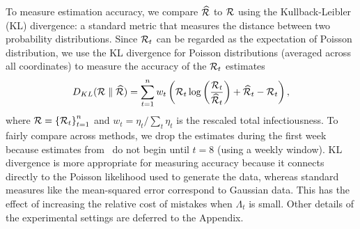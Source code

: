 To measure estimation accuracy, we compare $\widehat{\mathcal{R}}$ to $\mathcal{R}$ using
the Kullback-Leibler (KL) divergence: a standard metric that measures the
distance between two probability distributions. Since $\mathcal{R}_t$ can be regarded
as the expectation of Poisson distribution, we use the KL divergence for
Poisson distributions (averaged across all coordinates) to measure the accuracy
of the $\mathcal{R}_t$ estimates 
$$D_{KL}(\mathcal{R} \parallel \widehat{\mathcal{R}}) = \sum_{t=1}^n w_t \left(\mathcal{R}_t \log\left(\frac{\mathcal{R}_t}
{\widehat{\mathcal{R}}_t}\right) + \widehat{\mathcal{R}}_t - {\mathcal{R}}_t\right),$$ 
where $\mathcal{R} = \left\{ \mathcal{R}_t \right\}_{t=1}^n$ and 
$w_t = \eta_t / \sum_t \eta_t$ is the rescaled total infectiousness.
To fairly compare across methods, we drop the estimates during the first
week because estimates from \EpiEstim\ do not begin until $t=8$ (using a weekly
window). KL divergence is more appropriate for measuring accuracy because it
connects directly to the Poisson likelihood used to generate the data, whereas
standard measures like the mean-squared error correspond to Gaussian data. This
has the effect of increasing the relative cost of mistakes when $\Lambda_t$ is small.
Other details of the experimental settings are deferred to the Appendix. 


